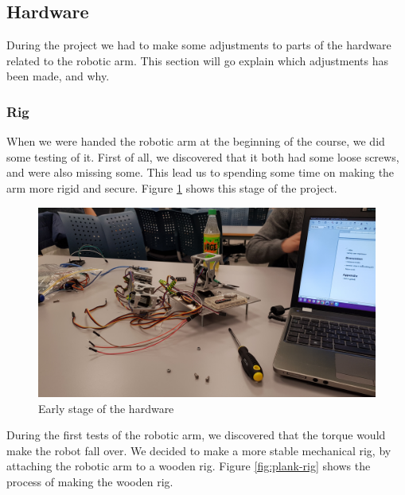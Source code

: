 \documentclass[11pt,a4paper, titlepage]{article}
\begin{document}
	\subsection{Hardware}
	During the project we had to make some adjustments to parts of the hardware related to the robotic arm. This section will go explain which adjustments has been made, and why.
	\subsubsection{Rig}
	When we were handed the robotic arm at the beginning of the course, we did some testing of it. First of all, we discovered that it both had some loose screws, and were also missing some. This lead us to spending some time on making the arm more rigid and secure. Figure \ref{fig:early-rig} shows this stage of the project.
	
	\begin{figure}[H]
		\centering
		\includegraphics[width=0.8\linewidth]{../Diagrams/early-setup.jpg}
		\caption{Early stage of the hardware}
		\label{fig:early-rig}
	\end{figure}
	
	During the first tests of the robotic arm, we discovered that the torque would make the robot fall over. We decided to make a more stable mechanical rig, by attaching the robotic arm to a wooden rig. Figure \ref{fig:plank-rig} shows the process of making the wooden rig.
\end{document}
